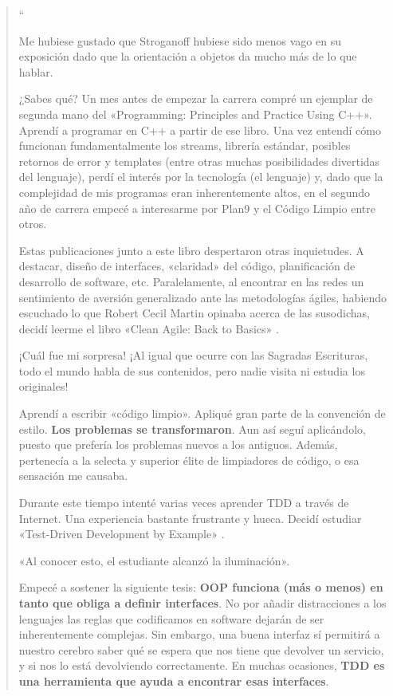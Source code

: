 \begin{quote}
``\itshape{%
    Me hubiese gustado que Stroganoff hubiese sido menos vago en su exposición dado
    que la orientación a objetos da mucho más de lo que hablar.

    ¿Sabes qué? Un mes antes de empezar la carrera compré un ejemplar de segunda mano
    del «Programming: Principles and Practice Using C++». \cite{Stroganoff} Aprendí a
    programar en C++ a partir de ese libro. Una vez entendí cómo funcionan fundamentalmente
    los streams, librería estándar, posibles retornos de error y templates (entre otras
    muchas posibilidades divertidas del lenguaje), perdí el interés por la tecnología
    (el lenguaje) y, dado que la complejidad de mis programas eran inherentemente altos,
    en el segundo año de carrera empecé a interesarme por Plan9 \cite{Plan9} y el
    Código Limpio \cite{CleanCode} entre otros.

    Estas publicaciones junto a este libro despertaron otras inquietudes. A destacar,
    diseño de interfaces, «claridad» del código, planificación de desarrollo de software,
    etc. Paralelamente, al encontrar en las redes un sentimiento de aversión generalizado
    ante las metodologías ágiles, habiendo escuchado lo que Robert Cecil Martin opinaba
    acerca de las susodichas, decidí leerme el libro «Clean Agile: Back to Basics» \cite{AgileBackToBasics}.

    ¡Cuál fue mi sorpresa! ¡Al igual que ocurre con las Sagradas Escrituras, todo el mundo 
    habla de sus contenidos, pero nadie visita ni estudia los originales!

    Aprendí a escribir «código limpio». Apliqué gran parte de la convención de estilo.
    \textbf{Los problemas se transformaron}. Aun así seguí aplicándolo, puesto que
    prefería los problemas nuevos a los antiguos. Además, pertenecía a la selecta y
    superior élite de limpiadores de código, o esa sensación me causaba.

    Durante este tiempo intenté varias veces aprender TDD a través de Internet. Una
    experiencia bastante frustrante y hueca. Decidí estudiar «Test-Driven Development
    by Example» \cite{TDD}.

    «Al conocer esto, el estudiante alcanzó la iluminación». \cite{koans}

    Empecé a sostener la siguiente tesis: \textbf{OOP funciona (más o menos) en tanto
    que obliga a definir interfaces}. No por añadir distracciones a los lenguajes las
    reglas que codificamos en software dejarán de ser inherentemente complejas.
    Sin embargo, una buena interfaz sí permitirá a nuestro cerebro saber qué se espera
    que nos tiene que devolver un servicio, y si nos lo está devolviendo correctamente.
    En muchas ocasiones, \textbf{TDD es una herramienta que ayuda a encontrar esas
    interfaces}.

}
\end{quote}
